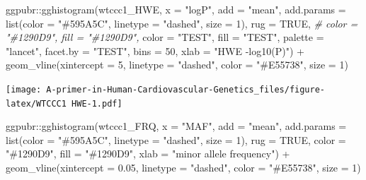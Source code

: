 \documentclass[
]{book}
\newenvironment{Shaded}{\begin{snugshade}}{\end{snugshade}}
\newcommand{\AttributeTok}[1]{\textcolor[rgb]{0.77,0.63,0.00}{#1}}
\newcommand{\CommentTok}[1]{\textcolor[rgb]{0.56,0.35,0.01}{\textit{#1}}}
\newcommand{\ConstantTok}[1]{\textcolor[rgb]{0.00,0.00,0.00}{#1}}
\newcommand{\DecValTok}[1]{\textcolor[rgb]{0.00,0.00,0.81}{#1}}
\newcommand{\FloatTok}[1]{\textcolor[rgb]{0.00,0.00,0.81}{#1}}
\newcommand{\FunctionTok}[1]{\textcolor[rgb]{0.00,0.00,0.00}{#1}}
\newcommand{\NormalTok}[1]{#1}
\newcommand{\SpecialCharTok}[1]{\textcolor[rgb]{0.00,0.00,0.00}{#1}}
\newcommand{\StringTok}[1]{\textcolor[rgb]{0.31,0.60,0.02}{#1}}
\begin{document}
\begin{Shaded}
\begin{Highlighting}[]
\NormalTok{ggpubr}\SpecialCharTok{::}\FunctionTok{gghistogram}\NormalTok{(wtccc1\_HWE, }\AttributeTok{x =} \StringTok{"logP"}\NormalTok{,}
                    \AttributeTok{add =} \StringTok{"mean"}\NormalTok{,}
                    \AttributeTok{add.params =} \FunctionTok{list}\NormalTok{(}\AttributeTok{color =} \StringTok{"\#595A5C"}\NormalTok{, }\AttributeTok{linetype =} \StringTok{"dashed"}\NormalTok{, }\AttributeTok{size =} \DecValTok{1}\NormalTok{),}
                    \AttributeTok{rug =} \ConstantTok{TRUE}\NormalTok{,}
                    \CommentTok{\# color = "\#1290D9", fill = "\#1290D9",}
                    \AttributeTok{color =} \StringTok{"TEST"}\NormalTok{, }\AttributeTok{fill =} \StringTok{"TEST"}\NormalTok{,}
                    \AttributeTok{palette =} \StringTok{"lancet"}\NormalTok{,}
                    \AttributeTok{facet.by =} \StringTok{"TEST"}\NormalTok{,}
                    \AttributeTok{bins =} \DecValTok{50}\NormalTok{,}
                    \AttributeTok{xlab =} \StringTok{"HWE {-}log10(P)"}\NormalTok{) }\SpecialCharTok{+}
  \FunctionTok{geom\_vline}\NormalTok{(}\AttributeTok{xintercept =} \DecValTok{5}\NormalTok{, }\AttributeTok{linetype =} \StringTok{"dashed"}\NormalTok{,}
                \AttributeTok{color =} \StringTok{"\#E55738"}\NormalTok{, }\AttributeTok{size =} \DecValTok{1}\NormalTok{)}
\end{Highlighting}
\end{Shaded}

\texttt{[image: A-primer-in-Human-Cardiovascular-Genetics\_files/figure-latex/WTCCC1 HWE-1.pdf]}

\begin{Shaded}
\begin{Highlighting}[]
\NormalTok{ggpubr}\SpecialCharTok{::}\FunctionTok{gghistogram}\NormalTok{(wtccc1\_FRQ, }\AttributeTok{x =} \StringTok{"MAF"}\NormalTok{,}
                    \AttributeTok{add =} \StringTok{"mean"}\NormalTok{, }\AttributeTok{add.params =} \FunctionTok{list}\NormalTok{(}\AttributeTok{color =} \StringTok{"\#595A5C"}\NormalTok{, }\AttributeTok{linetype =} \StringTok{"dashed"}\NormalTok{, }\AttributeTok{size =} \DecValTok{1}\NormalTok{),}
                    \AttributeTok{rug =} \ConstantTok{TRUE}\NormalTok{,}
                    \AttributeTok{color =} \StringTok{"\#1290D9"}\NormalTok{, }\AttributeTok{fill =} \StringTok{"\#1290D9"}\NormalTok{,}
                    \AttributeTok{xlab =} \StringTok{"minor allele frequency"}\NormalTok{) }\SpecialCharTok{+}
  \FunctionTok{geom\_vline}\NormalTok{(}\AttributeTok{xintercept =} \FloatTok{0.05}\NormalTok{, }\AttributeTok{linetype =} \StringTok{"dashed"}\NormalTok{,}
                \AttributeTok{color =} \StringTok{"\#E55738"}\NormalTok{, }\AttributeTok{size =} \DecValTok{1}\NormalTok{)}
\end{Highlighting}
\end{Shaded}
\end{document}
